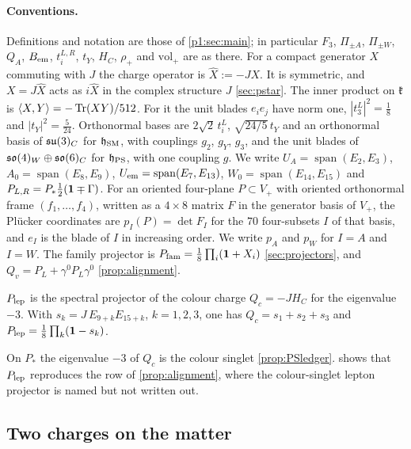 \paragraph{Conventions.} Definitions and notation are those of \cref{p1:sec:main}; in particular $F_3$, $\Pi_{\pm A}$, $\Pi_{\pm W}$, $Q_A$, $B_{\rm em}$, $t^{L,R}_i$,
$t_Y$, $H_C$, $\rho_+$ and $\mathrm{vol}_+$ are as there. For a compact generator $X$ commuting with $J$ the charge operator is $\hat X:=-JX$. It is symmetric, and
$X=J\hat X$ acts as $i\hat X$ in the complex structure $J$ \cref{sec:pstar}. The inner product on $\mathfrak k$ is $\langle X,Y\rangle=-\operatorname{Tr}(XY)/512$. For it the unit
blades $e_ie_j$ have norm one, $|t^L_3|^2=\tfrac18$ and $|t_Y|^2=\tfrac5{24}$. Orthonormal bases are $2\sqrt2\,t^L_i$, $\sqrt{24/5}\,t_Y$ and an orthonormal basis of
$\mathfrak{su}(3)_C$ for $\mathfrak h_{\rm SM}$, with couplings $g_2$, $g_Y$, $g_3$, and the unit blades of $\mathfrak{so}(4)_W\oplus\mathfrak{so}(6)_C$ for $\mathfrak h_{\rm PS}$, with one coupling
$g$. We write $U_A=\operatorname{span}(E_2,E_3)$, $A_0=\operatorname{span}(E_8,E_9)$, $U_{\rm em}=\operatorname{span}(E_7,E_{13})$, $W_0=\operatorname{span}(E_{14},E_{15})$
and $P_{L,R}=P_*\tfrac12(\mathbf 1\mp\Gamma)$. For an oriented four-plane $P\subset V_+$ with oriented orthonormal frame $(f_1,\dots,f_4)$, written as a $4\times8$ matrix $F$ in
the generator basis of $V_+$, the Plücker coordinates are $p_I(P)=\det F_I$ for the $70$ four-subsets $I$ of that basis, and $e_I$ is the blade of $I$ in increasing
order. We write $p_A$ and $p_W$ for $I=A$ and $I=W$. The family projector is $P_{\rm fam}=\tfrac18\prod_i(\mathbf 1+X_i)$ \cref{sec:projectors}, and
$Q_v=P_L+\gamma^0P_L\gamma^0$ \cref{prop:alignment}.

\begin{definition}
\label{p3:def:plep}
$P_{\rm lep}$ is the spectral projector of the colour charge $Q_c=-JH_C$ for the eigenvalue $-3$. With $s_k=J\,E_{9+k}E_{15+k}$, $k=1,2,3$, one has
$Q_c=s_1+s_2+s_3$ and $P_{\rm lep}=\tfrac18\prod_k(\mathbf 1-s_k)$.
\end{definition}

On $P_*$ the eigenvalue $-3$ of $Q_c$ is the colour singlet \cref{prop:PSledger}.  shows that $P_{\rm lep}$ reproduces the row of
\cref{prop:alignment}, where the colour-singlet lepton projector is named but not written out.

\subsection{Two charges on the matter}
\label{p3:sec:charges}

